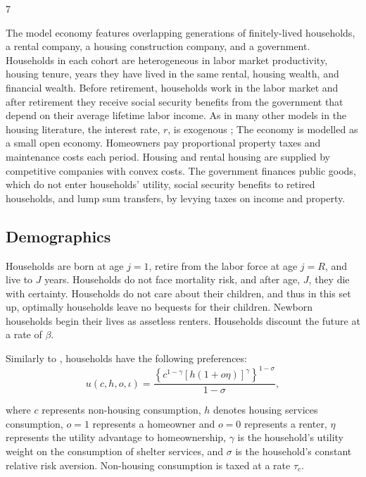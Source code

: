 7\documentclass[parskip=full]{article}
\begin{document}
The model economy features overlapping generations of finitely-lived households, a rental company, a housing construction company, and a government. Households in each cohort are heterogeneous in labor market productivity, housing tenure, years they have lived in the same rental, housing wealth, and financial wealth. Before retirement, households work in the labor market and after retirement they receive social security benefits from the government that depend on their average lifetime labor income. As in many other models in the housing literature, the interest rate, $r$, is exogenous \citep{sommeretal-2013,arslanetal-2015,sommersullivan-2017,kaplanetal-2019}; The economy is modelled as a small open economy. Homeowners pay proportional property taxes and maintenance costs each period. Housing and rental housing are supplied by competitive companies with convex costs. The government finances public goods, which do not enter households' utility, social security benefits to retired households, and lump sum transfers, by levying taxes on income and property.

\subsection{Demographics}\label{subsection:demographics}

Households are born at age $j=1$, retire from the labor force at age $j=R$, and live to $J$ years. Households do not face mortality risk, and after age, $J$, they die with certainty. Households do not care about their children, and thus in this set up, optimally households leave no bequests for their children. Newborn households begin their lives as assetless renters. Households discount the future at a rate of $\beta$.

Similarly to \citet{sommersullivan-2017}, households have the following preferences:
\begin{equation*}
    u(c,h,o,\iota)=\frac{\left\{c^{1-\gamma} \left[h(1+o\eta)\right]^{\gamma}\right\}^{1-\sigma}}{1-\sigma},
\end{equation*}

\noindent where $c$ represents non-housing consumption, $h$ denotes housing services consumption, $o=1$ represents a homeowner and $o=0$ represents a renter, $\eta$ represents the utility advantage to homeownership, $\gamma$ is the household's utility weight on the consumption of shelter services, and $\sigma$ is the household's constant relative risk aversion. Non-housing consumption is taxed at a rate $\tau_{c}$. 
\end{document}
